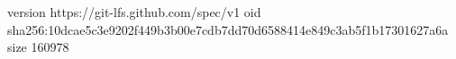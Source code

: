 version https://git-lfs.github.com/spec/v1
oid sha256:10dcae5c3e9202f449b3b00e7cdb7dd70d6588414e849c3ab5f1b17301627a6a
size 160978
